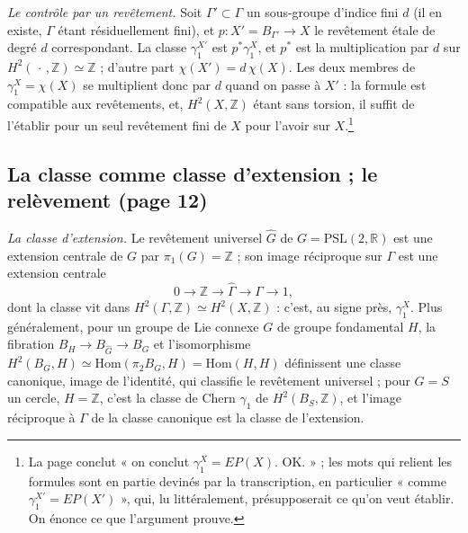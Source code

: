 \documentclass[11pt,a4paper]{article}
\begin{document}
\emph{Le contrôle par un revêtement.} Soit $\Gamma' \subset \Gamma$ un
sous-groupe d'indice fini $d$ (il en existe, $\Gamma$ étant résiduellement
fini), et $p : X' = B_{\Gamma'} \to X$ le revêtement étale de degré $d$
correspondant. La classe $\gamma_{1}^{X'}$ est $p^{*}\gamma_{1}^{X}$, et
$p^{*}$ est la multiplication par $d$ sur $H^{2}(\,\cdot\,,\mathbb{Z}) \simeq
\mathbb{Z}$ ; d'autre part $\chi(X') = d\,\chi(X)$. Les deux membres de
$\gamma_{1}^{X} = \chi(X)$ se multiplient donc par $d$ quand on passe à $X'$ :
la formule est compatible aux revêtements, et, $H^{2}(X,\mathbb{Z})$ étant
sans torsion, il suffit de l'établir pour un seul revêtement fini de $X$
pour l'avoir sur $X$.\footnote{La page conclut « on conclut $\gamma_{1}^{X} =
EP(X)$. OK. » ; les mots qui relient les formules sont en partie devinés par
la transcription, en particulier « comme $\gamma_{1}^{X'} = EP(X')$ », qui,
lu littéralement, présupposerait ce qu'on veut établir. On énonce ce que
l'argument prouve.}

\subsection*{La classe comme classe d'extension ; le relèvement (page 12)}

\emph{La classe d'extension.} Le revêtement universel $\widehat{G}$ de $G =
\mathrm{PSL}(2,\mathbb{R})$ est une extension centrale de $G$ par $\pi_{1}(G)
= \mathbb{Z}$ ; son image réciproque sur $\Gamma$ est une extension centrale
\[
  0 \to \mathbb{Z} \to \widehat{\Gamma} \to \Gamma \to 1,
\]
dont la classe vit dans $H^{2}(\Gamma,\mathbb{Z}) \simeq H^{2}(X,\mathbb{Z})$ :
c'est, au signe près, $\gamma_{1}^{X}$. Plus généralement, pour un groupe de
Lie connexe $G$ de groupe fondamental $H$, la fibration $B_{H} \to
B_{\widehat{G}} \to B_{G}$ et l'isomorphisme $H^{2}(B_{G}, H) \simeq
\mathrm{Hom}(\pi_{2}B_{G}, H) = \mathrm{Hom}(H,H)$ définissent une classe
canonique, image de l'identité, qui classifie le revêtement universel ; pour
$G = S$ un cercle, $H = \mathbb{Z}$, c'est la classe de Chern $\gamma_{1}$
de $H^{2}(B_{S},\mathbb{Z})$, et l'image réciproque à $\Gamma$ de la classe
canonique est la classe de l'extension.
\end{document}
